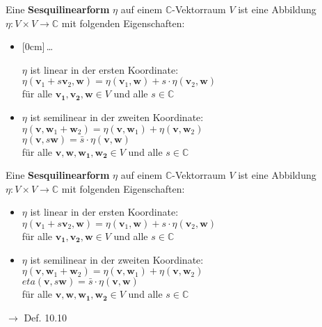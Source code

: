 \documentclass[11pt]{article}
\renewcommand{\cite}[1]{\par\bigskip\hfill{\color{gray}\tiny\(\to\) #1}}
\newcommand{\CC}{\mathbb{C}}
\renewcommand{\vec}[1]{\mathbf{#1}}
\newcommand{\hide}[1]{\parbox{0cm}{\raisebox{-7pt}[0cm]{\dots}}\color{white}#1\color{black}}
\let\olddots\dots
\renewcommand{\dots}{\,\olddots\,}
\newenvironment{field}{}{\newpage}
\newif\ifnote
\newenvironment{note}{\notetrue}{\notefalse}
\newcommand{\localtag}{}
\newcommand{\globaltag}{}
\newcommand{\uuid}{}
\newcommand{\tags}[1]{
    \ifnote
        \renewcommand{\localtag}{#1}
    \else
        \renewcommand{\globaltag}{#1}
    \fi
    }
\newcommand{\xplain}[1]{\renewcommand{\uuid}{#1}}
\begin{document}
\begin{note}
    \tags{Def}
    \xplain{7e2e222e-bbf4-11ec-8422-0242ac120002}

    \begin{field} %
        Eine \textbf{Sesquilinearform} \(\eta\) auf einem \(\CC\)-Vektorraum \(V\) ist eine Abbildung \(\eta\colon V\times V \longrightarrow \CC\) mit folgenden Eigenschaften:
        \begin{itemize}
            \item \hide{\(\eta\) ist linear in der ersten Koordinate:\\
                \(\eta(\vec{v}_1+s\vec{v}_2, \vec{w}) = \eta(\vec{v}_1, \vec{w}) + s\cdot \eta(\vec{v}_2,\vec{w})\)\\
                für alle \(\vec{v_1, v_2, w} \in V\) und alle \(s\in\CC\)}
            \item \(\eta\) ist semilinear in der zweiten Koordinate:\\
                \(\eta(\vec{v}, \vec{w}_1+\vec{w}_2) = \eta(\vec{v}, \vec{w}_1) + \eta(\vec{v},\vec{w}_2)\)\\
                \(\eta(\vec{v}, s\vec{w}) = \bar{s}\cdot \eta(\vec{v},\vec{w})\)\\
                für alle \(\vec{v, w, w_1, w_2} \in V\) und alle \(s\in\CC\)
        \end{itemize}
    \end{field}

    \begin{field} %
        Eine \textbf{Sesquilinearform} \(\eta\) auf einem \(\CC\)-Vektorraum \(V\) ist eine Abbildung \(\eta\colon V\times V \longrightarrow \CC\) mit folgenden Eigenschaften:
        \begin{itemize}
            \item \(\eta\) ist linear in der ersten Koordinate:\\
                \(\eta(\vec{v}_1+s\vec{v}_2, \vec{w}) = \eta(\vec{v}_1, \vec{w}) + s\cdot \eta(\vec{v}_2,\vec{w})\)\\
                für alle \(\vec{v_1, v_2, w} \in V\) und alle \(s\in\CC\)
            \item \(\eta\) ist semilinear in der zweiten Koordinate:\\
                \(\eta(\vec{v}, \vec{w}_1+\vec{w}_2) = \eta(\vec{v}, \vec{w}_1) + \eta(\vec{v},\vec{w}_2)\)\\
                \(eta(\vec{v}, s\vec{w}) = \bar{s}\cdot \eta(\vec{v},\vec{w})\)\\
                für alle \(\vec{v, w, w_1, w_2} \in V\) und alle \(s\in\CC\)
        \end{itemize}
        \cite{Def. 10.10}
    \end{field}


\end{note}
\end{document}
